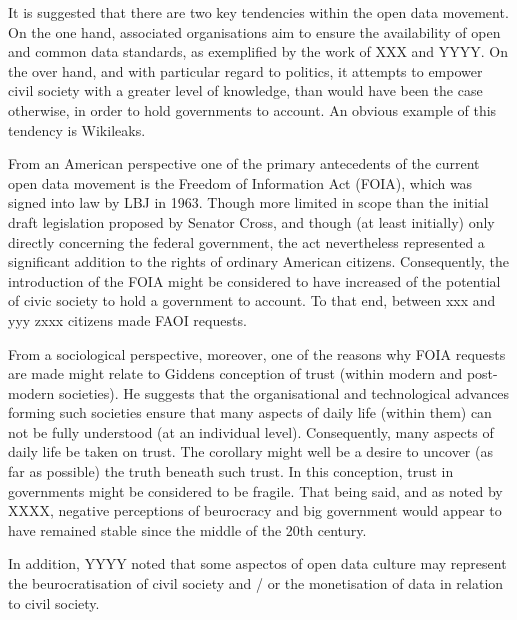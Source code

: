 It is suggested that there are two key tendencies within the open data movement.
On the one hand, associated organisations aim to ensure the availability of open and common data standards, as exemplified by the work of XXX and YYYY.
On the over hand, and with particular regard to politics, it attempts to empower civil society with a greater level of knowledge, than would have been the case otherwise, in order to hold governments to account.
An obvious example of this tendency is Wikileaks.  

From an American perspective one of the primary antecedents of the current open data movement is the Freedom of Information Act (FOIA), which was signed into law by LBJ in 1963.
Though more limited in scope than the initial draft legislation proposed by Senator Cross, and though (at least initially) only directly concerning the federal government, the act nevertheless represented a significant addition to the rights of ordinary American citizens.
Consequently, the introduction of the FOIA might be considered to have increased of the potential of civic society to hold a government to account.
To that end, between xxx and yyy zxxx citizens made FAOI requests.

From a sociological perspective, moreover, one of the reasons why FOIA requests are made might relate to Giddens conception of trust (within modern and post-modern societies).
He suggests that the organisational and technological advances forming such societies ensure that many aspects of daily life (within them) can not be fully understood (at an individual level).
Consequently, many aspects of daily life be taken on trust.
The corollary might well be a desire to uncover (as far as possible) the truth beneath such trust.
In this conception, trust in governments might be considered to be fragile.
That being said, and as noted by XXXX, negative perceptions of beurocracy and big government would appear to have remained stable since the middle of the 20th century. 

In addition, YYYY noted that some aspectos of open data culture may represent the beurocratisation of civil society and / or the monetisation of data in relation to civil society.